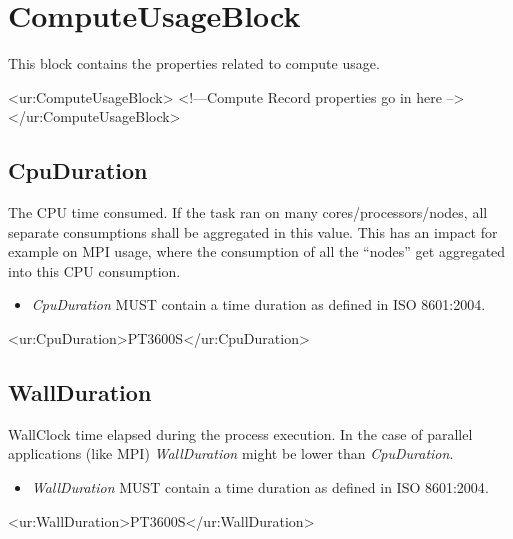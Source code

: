 
\section{ComputeUsageBlock}

This block contains the properties related to compute usage.

\begin{XMLexample}
<ur:ComputeUsageBlock>
<!—Compute Record properties go in here -->
</ur:ComputeUsageBlock>
\end{XMLexample}






\subsection{CpuDuration}

The CPU time consumed. If the task ran on many cores/processors/nodes, all separate consumptions shall be aggregated in this value. This has an impact for example on MPI usage, where the consumption of all the ``nodes'' get aggregated into this CPU consumption.
\begin{itemize}
\item \emph{CpuDuration} MUST contain a time duration as defined in ISO 8601:2004\cite{wolf1998date}.
\end{itemize}

\begin{XMLexample}
<ur:CpuDuration>PT3600S</ur:CpuDuration>
\end{XMLexample}






\subsection{WallDuration}

WallClock time elapsed during the process execution. In the case of parallel applications (like MPI) \emph{WallDuration} might be lower than \emph{CpuDuration}.
\begin{itemize}
\item \emph{WallDuration} MUST contain a time duration as defined in ISO 8601:2004\cite{wolf1998date}.
\end{itemize}

\begin{XMLexample}
<ur:WallDuration>PT3600S</ur:WallDuration>
\end{XMLexample}



